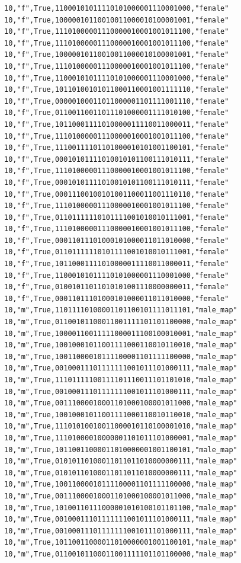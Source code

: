 \documentclass[authoryearcitations]{UoYCSproject}
\begin{document}
\begin{framed}
\begin{verbatim}
10,"f",True,11000101011110101000001110001000,"female"
10,"f",True,10000010110010011000010100001001,"female"
10,"f",True,11101000001110000010001001011100,"female"
10,"f",True,11101000001110000010001001011100,"female"
10,"f",True,10000010110010011000010100001001,"female"
10,"f",True,11101000001110000010001001011100,"female"
10,"f",True,11000101011110101000001110001000,"female"
10,"f",True,10110100101011000110001001111110,"female"
10,"f",True,00000100011011000001101111001110,"female"
10,"f",True,01100110011011101000001111010100,"female"
10,"f",True,10110001111010000011110011000011,"female"
10,"f",True,11101000001110000010001001011100,"female"
10,"f",True,11100111101101000010101001100101,"female"
10,"f",True,00010101111010010101100111010111,"female"
10,"f",True,11101000001110000010001001011100,"female"
10,"f",True,00010101111010010101100111010111,"female"
10,"f",True,00011100100101001100011001110110,"female"
10,"f",True,11101000001110000010001001011100,"female"
10,"f",True,01101111110101111001010010111001,"female"
10,"f",True,11101000001110000010001001011100,"female"
10,"f",True,00011011101000101000011011010000,"female"
10,"f",True,01101111110101111001010010111001,"female"
10,"f",True,10110001111010000011110011000011,"female"
10,"f",True,11000101011110101000001110001000,"female"
10,"f",True,01001011011010101001110000000011,"female"
10,"f",True,00011011101000101000011011010000,"female"
10,"m",True,11011110100001101100101111011101,"male_map"
10,"m",True,01100101100011001111101101100000,"male_map"
10,"m",True,10000110011111000011100100010001,"male_map"
10,"m",True,10010001011001111000110010110010,"male_map"
10,"m",True,10011000010111100001101111100000,"male_map"
10,"m",True,00100011101111111001011101000111,"male_map"
10,"m",True,11101111100111101110011101101010,"male_map"
10,"m",True,00100011101111111001011101000111,"male_map"
10,"m",True,00111000010001101000100001011000,"male_map"
10,"m",True,10010001011001111000110010110010,"male_map"
10,"m",True,11101010010011000010110100001010,"male_map"
10,"m",True,11101000010000001101011101000001,"male_map"
10,"m",True,10110011000011010000001001100101,"male_map"
10,"m",True,01010110100011011011010000000111,"male_map"
10,"m",True,01010110100011011011010000000111,"male_map"
10,"m",True,10011000010111100001101111100000,"male_map"
10,"m",True,00111000010001101000100001011000,"male_map"
10,"m",True,10100110111000001010100101101100,"male_map"
10,"m",True,00100011101111111001011101000111,"male_map"
10,"m",True,00100011101111111001011101000111,"male_map"
10,"m",True,10110011000011010000001001100101,"male_map"
10,"m",True,01100101100011001111101101100000,"male_map"

\end{verbatim}
\end{framed}
\end{document}
